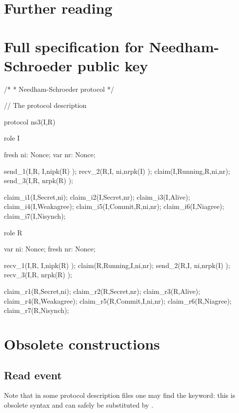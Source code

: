 \documentclass{book}
\begin{document}
\chapter{Further reading}
\label{sec:further}






\appendix


\chapter{Full specification for Needham-Schroeder public key}
\label{app:ns3}

\begin{spdl}
/* 
 * Needham-Schroeder protocol
 */


// The protocol description

protocol ns3(I,R)
{
  role I
  {
    fresh ni: Nonce;
    var nr: Nonce;

    send_1(I,R, {I,ni}pk(R) );
    recv_2(R,I, {ni,nr}pk(I) );
    claim(I,Running,R,ni,nr);
    send_3(I,R, {nr}pk(R) );

    claim_i1(I,Secret,ni);
    claim_i2(I,Secret,nr);
    claim_i3(I,Alive);
    claim_i4(I,Weakagree);
    claim_i5(I,Commit,R,ni,nr);
    claim_i6(I,Niagree);
    claim_i7(I,Nisynch);
  }  
  
  role R
  {
    var ni: Nonce;
    fresh nr: Nonce;

   recv_1(I,R, {I,ni}pk(R) );
    claim(R,Running,I,ni,nr);
    send_2(R,I, {ni,nr}pk(I) );
    recv_3(I,R, {nr}pk(R) );

    claim_r1(R,Secret,ni);
    claim_r2(R,Secret,nr);
    claim_r3(R,Alive);
    claim_r4(R,Weakagree);
    claim_r5(R,Commit,I,ni,nr);
    claim_r6(R,Niagree);
    claim_r7(R,Nisynch);
  }
}
\end{spdl}

\chapter{Obsolete constructions}

\section{Read event}
%
Note that in some protocol description files one may find the 
keyword: this is obsolete syntax and can safely be substituted by
.




\printindex
\end{document}
